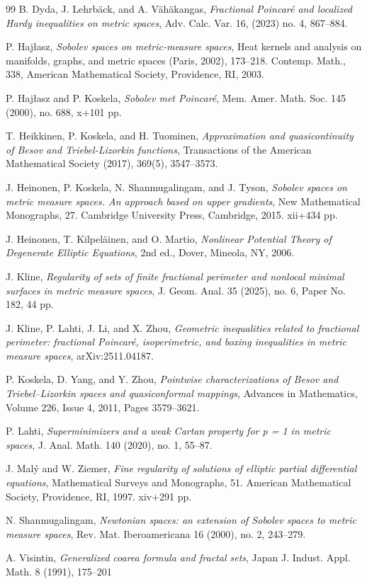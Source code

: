 \documentclass[11pt,leqno]{amsart}
\numberwithin{equation}{section}
\theoremstyle{definition}
\begin{document}
\begin{thebibliography}{99}
		B. Dyda, J. Lehrb\"ack, and A. V\"ah\"akangas,
		\textit{Fractional Poincar\'e and localized Hardy inequalities on metric spaces},
		Adv. Calc. Var. 16, (2023) no. 4, 867--884.
		
		P. Hajłasz,
		\textit{Sobolev spaces on metric-measure spaces},
		Heat kernels and analysis on manifolds, graphs, and metric spaces (Paris, 2002), 173--218.
		Contemp. Math., 338,
		American Mathematical Society, Providence, RI, 2003.
		
		P. Hajłasz and P.  Koskela,
		\textit{Sobolev met Poincar\'e},
		Mem. Amer. Math. Soc. 145 (2000), no. 688, x+101 pp.
		
		T. Heikkinen, P. Koskela, and H. Tuominen,
		\textit{Approximation and quasicontinuity of Besov and Triebel-Lizorkin functions},
		Transactions of the American Mathematical Society (2017), 369(5), 3547--3573.
		
		J. Heinonen, P. Koskela, N. Shanmugalingam, and J. Tyson,
		\textit{Sobolev spaces on metric measure spaces. An approach based on upper gradients},
		New Mathematical Monographs, 27. Cambridge University Press, Cambridge, 2015. xii+434 pp.
		
		J. Heinonen, T. Kilpeläinen, and O. Martio,
		\textit{Nonlinear Potential Theory of Degenerate Elliptic Equations},
		2nd ed., Dover, Mineola, NY, 2006. 
		
		J. Kline,
		\textit{Regularity of sets of finite fractional perimeter and nonlocal minimal surfaces in metric measure spaces},
		J. Geom. Anal. 35 (2025), no. 6, Paper No. 182, 44 pp.
		
		J. Kline, P. Lahti, J. Li, and X. Zhou,
		\textit{Geometric inequalities related to fractional perimeter: fractional Poincaré, isoperimetric, and boxing inequalities in metric measure spaces},
		arXiv:2511.04187.
		
		P. Koskela, D. Yang, and Y. Zhou,
		\textit{Pointwise characterizations of Besov and Triebel–Lizorkin spaces and quasiconformal mappings}, Advances in Mathematics, Volume 226, Issue 4, 2011, Pages 3579--3621.
		
		P. Lahti,
		\textit{Superminimizers and a weak Cartan property for p = 1 in metric spaces},
		J. Anal. Math. 140 (2020), no. 1, 55--87.	
		
		
		
		J. Mal\'{y} and W. Ziemer,
		\textit{Fine regularity of solutions of elliptic partial differential equations},
		Mathematical Surveys and Monographs, 51. American Mathematical Society, Providence, RI, 1997. xiv+291 pp.
		
		
		N. Shanmugalingam,
		\textit{Newtonian spaces: an extension of Sobolev spaces to metric measure spaces},
		Rev. Mat. Iberoamericana 16 (2000), no. 2, 243--279.
		
		A. Visintin,
		\textit{Generalized coarea formula and fractal sets},
		Japan J. Indust. Appl. Math. 8 (1991), 175--201
		
	\end{thebibliography}
	
\end{document}
